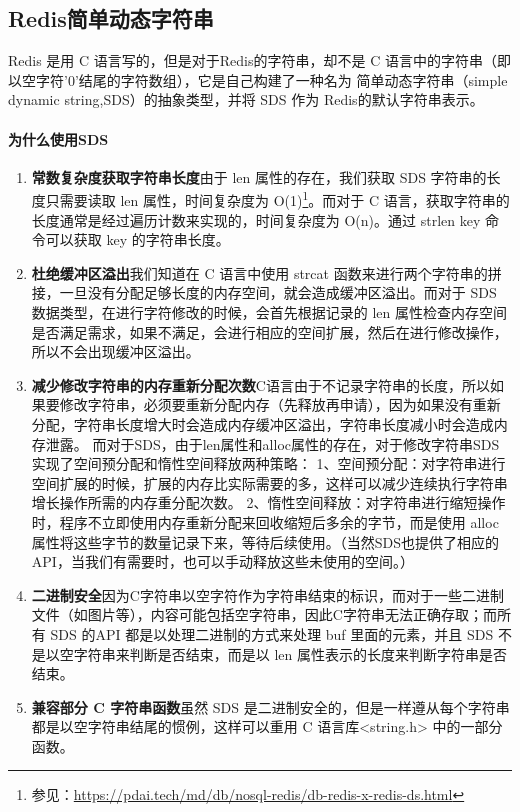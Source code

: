 \documentclass[../../../interview-questions.tex]{subfiles}
\begin{document}
\subsection{Redis简单动态字符串}

Redis 是用 C 语言写的，但是对于Redis的字符串，却不是 C 语言中的字符串（即以空字符’0’结尾的字符数组），它是自己构建了一种名为 简单动态字符串（simple dynamic string,SDS）的抽象类型，并将 SDS 作为 Redis的默认字符串表示。 


\paragraph{为什么使用SDS}

\begin{enumerate}
    \item {\textbf{常数复杂度获取字符串长度}}由于 len 属性的存在，我们获取 SDS 字符串的长度只需要读取 len 属性，时间复杂度为 O(1)\footnote{参见：\url{https://pdai.tech/md/db/nosql-redis/db-redis-x-redis-ds.html}}。而对于 C 语言，获取字符串的长度通常是经过遍历计数来实现的，时间复杂度为 O(n)。通过 strlen key 命令可以获取 key 的字符串长度。
    \item {\textbf{杜绝缓冲区溢出}}我们知道在 C 语言中使用 strcat  函数来进行两个字符串的拼接，一旦没有分配足够长度的内存空间，就会造成缓冲区溢出。而对于 SDS 数据类型，在进行字符修改的时候，会首先根据记录的 len 属性检查内存空间是否满足需求，如果不满足，会进行相应的空间扩展，然后在进行修改操作，所以不会出现缓冲区溢出。
    \item {\textbf{减少修改字符串的内存重新分配次数}}C语言由于不记录字符串的长度，所以如果要修改字符串，必须要重新分配内存（先释放再申请），因为如果没有重新分配，字符串长度增大时会造成内存缓冲区溢出，字符串长度减小时会造成内存泄露。 而对于SDS，由于len属性和alloc属性的存在，对于修改字符串SDS实现了空间预分配和惰性空间释放两种策略： 1、空间预分配：对字符串进行空间扩展的时候，扩展的内存比实际需要的多，这样可以减少连续执行字符串增长操作所需的内存重分配次数。 2、惰性空间释放：对字符串进行缩短操作时，程序不立即使用内存重新分配来回收缩短后多余的字节，而是使用 alloc 属性将这些字节的数量记录下来，等待后续使用。（当然SDS也提供了相应的API，当我们有需要时，也可以手动释放这些未使用的空间。）
    \item {\textbf{二进制安全}}因为C字符串以空字符作为字符串结束的标识，而对于一些二进制文件（如图片等），内容可能包括空字符串，因此C字符串无法正确存取；而所有 SDS 的API 都是以处理二进制的方式来处理 buf 里面的元素，并且 SDS 不是以空字符串来判断是否结束，而是以 len 属性表示的长度来判断字符串是否结束。 
    \item {\textbf{兼容部分 C 字符串函数}}虽然 SDS 是二进制安全的，但是一样遵从每个字符串都是以空字符串结尾的惯例，这样可以重用 C 语言库<string.h> 中的一部分函数。
\end{enumerate}
        
\end{document}
